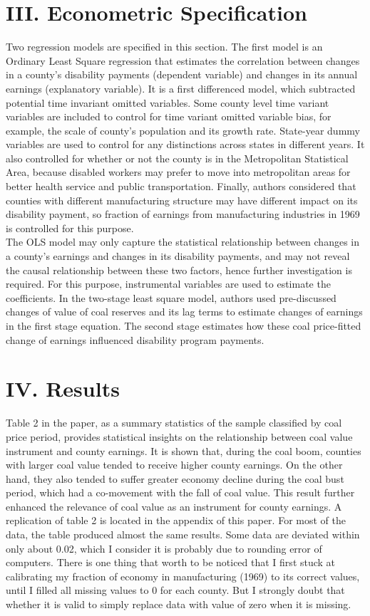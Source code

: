 \documentclass{article} %
\begin{document}
\section{III. Econometric Specification} 
Two regression models are specified in this section. The first model is an Ordinary Least Square regression that estimates the correlation between changes in a county's disability payments (dependent variable) and changes in its annual earnings (explanatory variable). It is a first differenced model, which subtracted potential time invariant omitted variables. Some county level time variant variables are included to control for time variant omitted variable bias, for example, the scale of county's population and its growth rate. State-year dummy variables are used to control for any distinctions across states in different years. It also controlled for whether or not the county is in the Metropolitan Statistical Area, because disabled workers may prefer to move into metropolitan areas for better health service and public transportation. Finally, authors considered that counties with different manufacturing structure may have different impact on its disability payment, so fraction of earnings from manufacturing industries in 1969 is controlled for this purpose. \\
The OLS model may only capture the statistical relationship between changes in a county's earnings and changes in its disability payments, and may not reveal the causal relationship between these two factors, hence further investigation is required. For this purpose, instrumental variables are used to estimate the coefficients. In the two-stage least square model, authors used pre-discussed changes of value of coal reserves and its lag terms to estimate changes of earnings in the first stage equation. The second stage estimates how these coal price-fitted change of earnings influenced disability program payments. 

\section{IV. Results}
Table 2 in the paper, as a summary statistics of the sample classified by coal price period, provides statistical insights on the relationship between coal value instrument and county earnings. It is shown that, during the coal boom, counties with larger coal value tended to receive higher county earnings. On the other hand, they also tended to suffer greater economy decline during the coal bust period, which had a co-movement with the fall of coal value. This result further enhanced the relevance of coal value as an instrument for county earnings. A replication of table 2 is located in the appendix of this paper. For most of the data, the table produced almost  the same results. Some data are deviated within only about 0.02, which I consider it is probably due to rounding error of computers. There is one thing that worth to be noticed that I first stuck at calibrating my fraction of economy in manufacturing (1969) to its correct values, until I filled all missing values to 0 for each county. But I strongly doubt that whether it is valid to simply replace data with value of zero when it is missing. 
\end{document}
